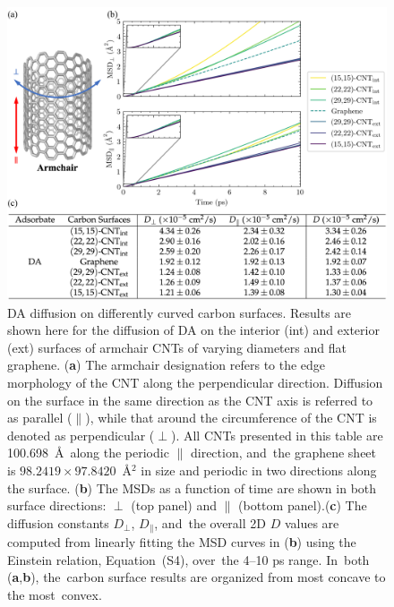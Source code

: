 \documentclass[molecules,article,accept,pdftex,moreauthors]{Definitions/mdpi}
\begin{document}
\begin{figure}[H]
    \includegraphics[width=\textwidth]{MergedFigs/fig3/output.png}
    \caption{DA diffusion on differently curved carbon surfaces. Results are shown here for the diffusion of DA on the interior (int) and exterior (ext) surfaces of armchair CNTs of varying diameters and flat graphene. (\textbf{a}) The armchair designation \cite{Tomanek2014} refers to the edge morphology of the CNT along the perpendicular direction. %
 Diffusion on the surface in the same direction as the CNT axis is referred to as parallel ($\parallel$), while that around the circumference of the CNT is denoted as perpendicular ($\perp$). All CNTs presented in this table are 100.698~\AA\ along the periodic $\parallel$ direction, and~the graphene sheet is $98.2419\times97.8420$~\AA$^2$ in size and periodic in two directions along the surface. (\textbf{b}) The MSDs as a function of time are shown in both surface directions: $\perp$ (top panel) and $\parallel$ (bottom panel).\linebreak (\textbf{c}) The diffusion constants $D_{\perp}$, $D_{\parallel}$, and~the overall 2D $D$ values are computed from linearly fitting the MSD curves in (\textbf{b}) using the Einstein relation, Equation~(S4), %
 over~the 4--10 ps range. In~both (\textbf{a},\textbf{b}), the~carbon surface results are organized from most concave to the most~convex. }
    \label{fig:curvature_dependency_MSD}
\end{figure}
\end{document}
